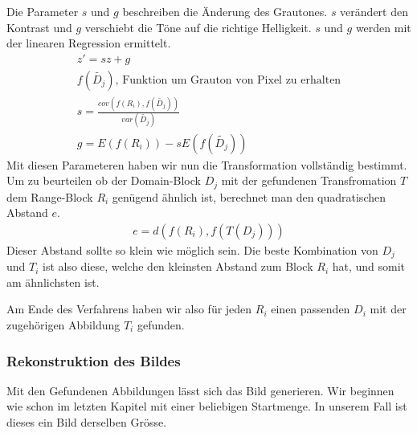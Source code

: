 Die Parameter $s$ und $g$ beschreiben die Änderung des Grautones. $s$ verändert den Kontrast und $g$ verschiebt die Töne auf die richtige Helligkeit. 
$s$ und $g$ werden mit der linearen Regression ermittelt. 
\begin{align*}
	z' = sz + g \\
	f(\tilde{D_j}) \text{, Funktion um Grauton von Pixel zu erhalten}  \\
	s = \frac{cov(f(R_i), f(\tilde{D_j}))}{var(\tilde{D_j})} \\
	g = E(f(R_i)) - s E(f(\tilde{D_j}))
\end{align*}
Mit diesen Parameteren haben wir nun die Transformation vollständig bestimmt.
Um zu beurteilen ob der Domain-Block $D_j$ mit der gefundenen Transfromation $T$ dem Range-Block $R_i$ genügend ähnlich ist, berechnet man den quadratischen Abstand $e$.
\begin{align*}
	e = d(f(R_i), f(T(D_j)))
\end{align*}
Dieser Abstand sollte so klein wie möglich sein.
Die beste Kombination von $D_j$ und $T_i$ ist also diese, welche den kleinsten Abstand zum Block $R_i$ hat, und somit am ähnlichsten ist.

Am Ende des Verfahrens haben wir also für jeden $R_i$ einen passenden $D_i$ mit der zugehörigen Abbildung $T_i$ gefunden.

\subsubsection{Rekonstruktion des Bildes}
Mit den Gefundenen Abbildungen lässt sich das Bild generieren.
Wir beginnen wie schon im letzten Kapitel mit einer beliebigen Startmenge.
In unserem Fall ist dieses ein Bild derselben Grösse.
